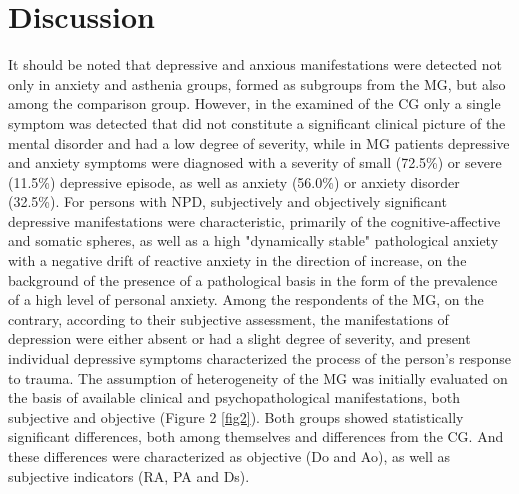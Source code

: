 \documentclass[twocolumn]{article}
\begin{document}
\section {Discussion}
\par It should be noted that depressive and anxious manifestations were detected not only in anxiety and asthenia groups, formed as subgroups from the MG, but also among the comparison group. However, in the examined of the CG only a single symptom was detected that did not constitute a significant clinical picture of the mental disorder and had a low degree of severity, while in MG patients depressive and anxiety symptoms were diagnosed with a severity of small (72.5\%) or severe (11.5\%) depressive episode, as well as anxiety (56.0\%) or anxiety disorder (32.5\%). For persons with NPD, subjectively and objectively significant depressive manifestations were characteristic, primarily of the cognitive-affective and somatic spheres, as well as a high "dynamically stable" pathological anxiety with a negative drift of reactive anxiety in the direction of increase, on the background of the presence of a pathological basis in the form of the prevalence of a high level of personal anxiety. Among the respondents of the MG, on the contrary, according to their subjective assessment, the manifestations of depression were either absent or had a slight degree of severity, and present individual depressive symptoms characterized the process of the person's response to trauma. The assumption of heterogeneity of the MG was initially evaluated on the basis of available clinical and psychopathological manifestations, both subjective and objective (Figure 2 \ref{fig2}). Both groups showed statistically significant differences, both among themselves and differences from the CG. And these differences were characterized as objective (Do and Ao), as well as subjective indicators (RA, PA and Ds). 
\end{document}
